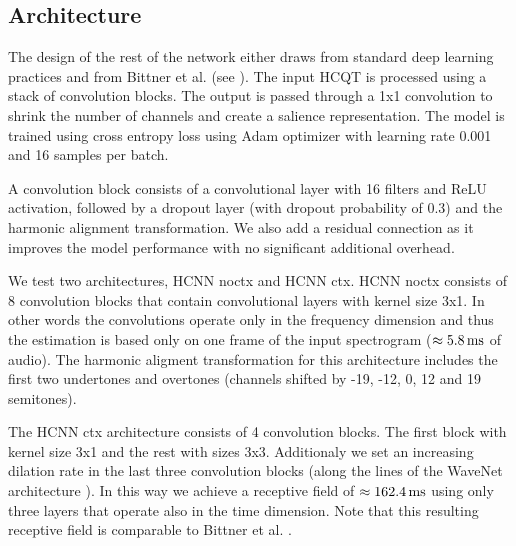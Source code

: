 \documentclass{article}
\begin{document}
\subsection{Architecture}

The design of the rest of the network either draws from standard deep learning practices and from Bittner et al. \cite{Bittner2017} (see ). The input HCQT is processed using a stack of convolution blocks. The output is passed through a 1x1 convolution to shrink the number of channels and create a salience representation. The model is trained using cross entropy loss using Adam optimizer with learning rate 0.001 and 16 samples per batch.

A convolution block consists of a convolutional layer with 16 filters and ReLU activation, followed by a dropout layer (with dropout probability of 0.3) and the harmonic alignment transformation. We also add a residual connection \cite{He2015} as it improves the model performance with no significant additional overhead.

We test two architectures, HCNN noctx and HCNN ctx. HCNN noctx consists of 8 convolution blocks that contain convolutional layers with kernel size 3x1. In other words the convolutions operate only in the frequency dimension and thus the estimation is based only on one frame of the input spectrogram ($\approx 5.8\,\rm ms$ of audio). The harmonic aligment transformation for this architecture includes the first two undertones and overtones (channels shifted by -19, -12, 0, 12 and 19 semitones).

The HCNN ctx architecture consists of 4 convolution blocks. The first block with kernel size 3x1 and the rest with sizes 3x3. Additionaly we set an increasing dilation rate in the last three convolution blocks (along the lines of the WaveNet architecture \cite{Oord2016}). In this way we achieve a receptive field of $\approx 162.4\,\rm ms$ using only three layers that operate also in the time dimension. Note that this resulting receptive field is comparable to Bittner et al. \cite{Bittner2017}.

\begin{table}
\centering
{}%
\caption{Comparison of the number of model parameters.}\label{tab:model_parametes}
\end{table}
\end{document}
